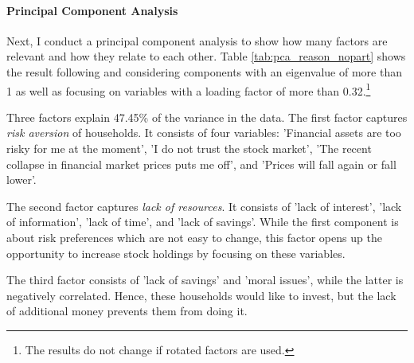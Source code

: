 \documentclass[ProjectABM]{subfiles}
\begin{document}


\paragraph{Principal Component Analysis}

Next, I conduct a principal component analysis to show how many factors are relevant and how they relate to each other. Table \ref{tab:pca_reason_nopart} shows the result following \cite{choi_2020, tabachnick_fidell_2007} and considering components with an eigenvalue of more than 1 as well as focusing on variables with a loading factor of more than 0.32.\footnote{The results do not change if rotated factors are used.}

Three factors explain 47.45\% of the variance in the data. The first factor captures \textit{risk aversion} of households. It consists of four variables: 'Financial assets are too risky for me at the moment', 'I do not trust the stock market', 'The recent collapse in financial market prices puts me off', and 'Prices will fall again or fall lower'. 

The second factor captures \textit{lack of resources}. It consists of 'lack of interest', 'lack of information', 'lack of time', and 'lack of savings'. While the first component is about risk preferences which are not easy to change, this factor opens up the opportunity to increase stock holdings by focusing on these variables.

The third factor consists of 'lack of savings' and 'moral issues', while the latter is negatively correlated. Hence, these households would like to invest, but the lack of additional money prevents them from doing it.
\end{document}
